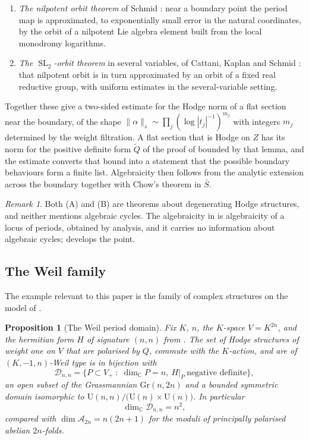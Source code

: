 \documentclass[11pt,reqno]{amsart}
\theoremstyle{plain}
\newtheorem{proposition}[theorem]{Proposition}
\theoremstyle{definition}
\theoremstyle{remark}
\newtheorem{remark}[theorem]{Remark}
\newcommand{\CC}{\mathbb{C}}
\newcommand{\cA}{\mathcal{A}}
\newcommand{\cD}{\mathcal{D}}
\DeclareMathOperator{\SL}{SL}
\begin{document}
\begin{enumerate}[label=\textup{(\Alph*)},leftmargin=2.2em]
\item \emph{The nilpotent orbit theorem} of Schmid \cite{Sch73}: near a
  boundary point the period map is approximated, to exponentially small error
  in the natural coordinates, by the orbit of a nilpotent Lie algebra element
  built from the local monodromy logarithms.
\item \emph{The $\SL_{2}$-orbit theorem} in several variables, of Cattani,
  Kaplan and Schmid \cite{CKS86}: that nilpotent orbit is in turn approximated
  by an orbit of a fixed real reductive group, with uniform estimates in the
  several-variable setting.
\end{enumerate}

Together these give a two-sided estimate for the Hodge norm of a flat section
near the boundary, of the shape $\|\alpha\|_{s}\sim\prod_{j}(\log|t_{j}|^{-1})^{m_{j}}$
with integers $m_{j}$ determined by the weight filtration. A flat section that
is Hodge on $Z$ has its norm for the positive definite form $\tilde Q$ of
the proof of  bounded by that lemma, and the
estimate converts that bound into a statement that the possible boundary
behaviours form a finite list. Algebraicity then follows from the analytic
extension across the boundary together with Chow's theorem in $\bar S$.

\begin{remark}\label{rem:cdkinputs}
Both (A) and (B) are theorems about degenerating Hodge structures, and
neither mentions algebraic cycles. The algebraicity in  is
algebraicity of a locus of periods, obtained by analysis, and it carries no
information about algebraic cycles;  develops the point.
\end{remark}

\subsection{The Weil family}

The example relevant to this paper is the family of complex structures on the
model of .

\begin{proposition}[The Weil period domain]\label{prop:weildomain}
Fix $K$, $n$, the $K$-space $V=K^{2n}$, and the hermitian form $H$ of
signature $(n,n)$ from . The set of Hodge structures of
weight one on $V$ that are polarised by $Q$, commute with the $K$-action, and
are of $(K,-1,n)$-Weil type is in bijection with
\[
  \cD_{n,n}
  =\bigl\{P\subset V_{+}\;:\;\dim_{\CC}P=n,\ H|_{P}\ \text{negative definite}\bigr\},
\]
an open subset of the Grassmannian $\mathrm{Gr}(n,2n)$ and a bounded symmetric
domain isomorphic to $\mathrm{U}(n,n)/\bigl(\mathrm{U}(n)\times\mathrm{U}(n)\bigr)$.
In particular
\[
  \dim_{\CC}\cD_{n,n}=n^{2},
\]
compared with $\dim\cA_{2n}=n(2n+1)$ for the moduli of principally polarised
abelian $2n$-folds.
\end{proposition}
\end{document}
